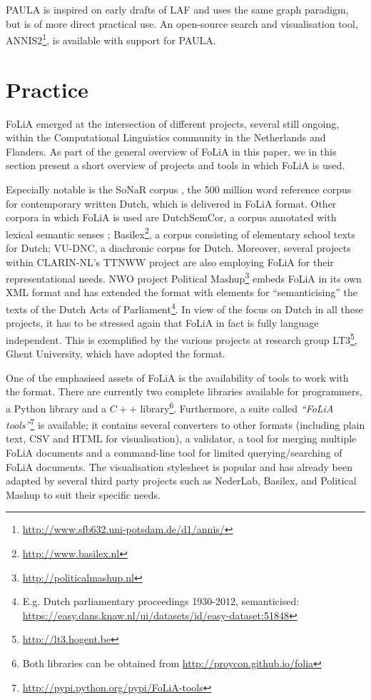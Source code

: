 \documentclass[a4paper,10pt,twoside]{article}
\begin{document}
PAULA is inspired on early drafts of LAF and uses the same graph paradigm, but
is of more direct practical use. An open-source search and visualisation tool,
ANNIS2\footnote{\url{http://www.sfb632.uni-potsdam.de/d1/annis/}}, is available
with support for PAULA.


\section{Practice}
\label{sec:practice}

FoLiA emerged at the intersection of different projects, several still ongoing, within the Computational
Linguistics community in the Netherlands and Flanders. As part of the general overview of FoLiA in this paper, we in
this section present a short overview of projects and tools in which FoLiA is
used.
 
Especially notable is the SoNaR corpus \cite{StevinSONAR2013}, the 500 million
word reference corpus for contemporary written Dutch, which is delivered in
FoLiA format. Other corpora in which FoLiA is used are DutchSemCor, a corpus
annotated with lexical semantic senses \cite{DUTCHSEMCOR};
Basilex\footnote{\url{http://www.basilex.nl}}, a corpus consisting of
elementary school texts for Dutch; VU-DNC, a diachronic corpus for Dutch.
Moreover, several projects within CLARIN-NL's TTNWW project are also employing FoLiA for
their representational needs. NWO project Political
Mashup\footnote{\url{http://politicalmashup.nl}} embeds FoLiA in its own XML
format and has extended the format with elements for ``semanticising'' the
texts of the Dutch Acts of Parliament\footnote{E.g. Dutch parliamentary
proceedings 1930-2012, semanticised:
\url{https://easy.dans.knaw.nl/ui/datasets/id/easy-dataset:51848}}. In view of
the focus on Dutch in all these projects, it has to be stressed again that
FoLiA in fact is fully language independent. This is exemplified by the various
projects at research group LT3\footnote{\url{http://lt3.hogent.be}}, Ghent
University, which have adopted the format.

One of the emphasised assets of FoLiA is the availability of tools to work with the
format. There are currently two complete libraries available for programmers, a Python
library and a $C++$ library\footnote{Both libraries can be obtained from
\url{http://proycon.github.io/folia}}. Furthermore, a suite called \emph{``FoLiA
tools''}\footnote{\url{http://pypi.python.org/pypi/FoLiA-tools}} is
available; it contains several converters to other formats (including plain
text, CSV and HTML for visualisation), a validator, a tool for merging
multiple FoLiA documents and a command-line tool for limited querying/searching
of FoLiA documents. The visualisation stylesheet is popular and has already
been adapted by several third party projects such as NederLab, Basilex, and Political
Mashup to suit their specific needs.
\end{document}
